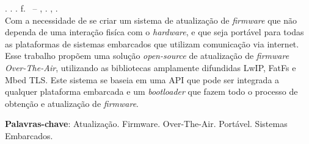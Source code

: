
\begin{resumo}[RESUMO]
\begin{SingleSpacing}

\imprimirautorcitacao. \imprimirtitulo. \imprimirdata. \pageref {LastPage} f. \imprimirprojeto\ – \imprimirdepartamento, \imprimirinstituicao. \imprimirlocal, \imprimirdata.\\

Com a necessidade de se criar um sistema de atualização de \textit{firmware} que não dependa de uma interação fisíca com o \textit{hardware}, e que seja portável para todas as plataformas de sistemas embarcados que utilizam comunicação via internet. 
Esse trabalho propõem uma solução \textit{open-source} de atualização de \textit{firmware Over-The-Air}, utilizando as bibliotecas amplamente difundidas LwIP, FatFs e Mbed TLS.
Este sistema se baseia em uma API que pode ser integrada a qualquer plataforma embarcada e um \textit{bootloader} que fazem todo o processo de obtenção e atualização de \textit{firmware}.

\textbf{Palavras-chave}: Atualização. Firmware. Over-The-Air. Portável. Sistemas Embarcados.




\end{SingleSpacing}
\end{resumo}



